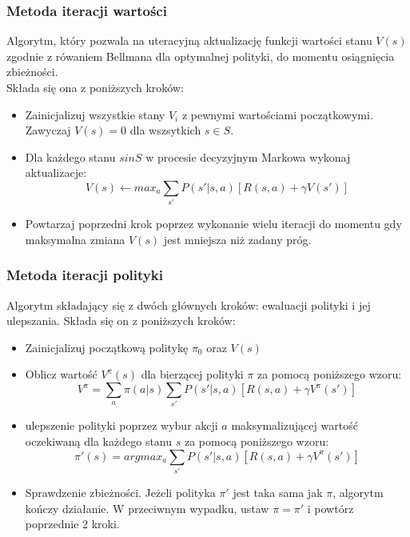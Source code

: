 \documentclass[a4paper, 10pt]{article}
\begin{document}
    \subsubsection{Metoda iteracji wartości}
    Algorytm, który pozwala na uteracyjną aktualizację funkcji wartości stanu \( V(s) \) zgodnie z rówaniem Bellmana dla optymalnej polityki, do momentu osiągnięcia zbieżności.
    \\ Składa się ona z poniższych kroków:
    \begin{itemize}
        \item Zainicjalizuj wszystkie stany \( V_i \) z pewnymi wartościami początkowymi. Zawyczaj \( V(s) = 0 \) dla wszsytkich \( s \in S \).
        \item Dla każdego stanu \( s in S \) w procesie decyzyjnym Markowa wykonaj aktualizacje:
        \[ V(s) \leftarrow max_a \sum_{s'} P(s'|s,a)[R(s,a) + \gamma V(s')] \]
        \item Powtarzaj poprzedni krok poprzez wykonanie wielu iteracji do momentu gdy maksymalna zmiana \( V(s) \) jest mniejsza niż zadany próg. 
    \end{itemize}
    \subsubsection{Metoda iteracji polityki}
    Algorytm składający się z dwóch głównych kroków: ewaluacji polityki i jej ulepszania. Składa się on z poniższych kroków:
    \begin{itemize} 
        \item Zainicjalizuj początkową politykę \( \pi_0 \) oraz \( V(s) \)
        \item Oblicz wartość \( V^\pi (s) \) dla bierzącej polityki \( \pi \) za pomocą poniższego wzoru:
        \[ V^\pi = \sum_{a} \pi(a|s) \sum_{s'} P(s'|s,a) [R(s,a) + \gamma V^\pi(s')] \]
        \item ulepszenie polityki poprzez wybur akcji \( a \) maksymalizującej wartość oczekiwaną dla każdego stanu \( s \) za pomocą poniższego wzoru:
        \[ \pi'(s) = argmax_a \sum_{s'} P(s'|s,a) [R(s,a) + \gamma V^\pi(s')] \]
        \item Sprawdzenie zbieżności. Jeżeli polityka \( \pi' \) jest taka sama jak \( \pi \), algorytm kończy działanie.
        W przeciwnym wypadku, ustaw \( \pi = \pi' \) i powtórz poprzednie 2 kroki. 
    \end{itemize}
\end{document}
